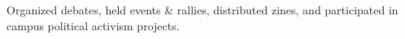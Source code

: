 \documentclass[]{article}
\begin{document}
Organized debates, held events \& rallies, distributed zines, and participated in campus political activism projects.

\newpage
\end{document}
